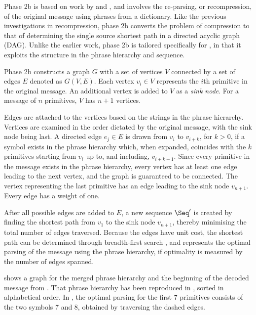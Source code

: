 Phase 2b is based on work by \citet{kr89:cj}
and \citet{klein97:cj}, and involves the re-parsing, or 
recompression, of the original
message using phrases from a dictionary.  Like the previous
investigations in recompression, phase 2b converts the 
problem of compression to that of determining the single
source shortest path in a directed acyclic graph (DAG).  Unlike
the earlier work, phase 2b is tailored specifically for \repair,
in that it exploits the structure in the 
phrase hierarchy and sequence.

Phase 2b constructs a graph $G$
with a set of vertices $V$ connected by a set of edges $E$  
denoted as $G (V,E)$.  Each vertex $v_i \in V$ represents the
$i$th primitive in the original message.  An additional vertex is 
added to $V$ as a {\emph {sink node}}.  For a 
message of $n$ primitives, $V$ has $n + 1$ vertices.

Edges are attached to the vertices based on the strings in
the phrase hierarchy.  
Vertices are examined in the order dictated by the original
message, with the sink node being last.
A directed edge $e_j \in E$ is drawn from $v_i$ to $v_{i + k}$, 
for $k > 0$, if a symbol exists in the phrase hierarchy which,
when expanded, coincides with the $k$ primitives starting from
$v_i$ up to, and including, $v_{i + k - 1}$.
Since every primitive in the
message exists in the phrase hierarchy, every vertex has at 
least one edge leading to the next vertex, and the graph is 
guaranteed to be connected.  The vertex representing the 
last primitive has an edge leading to the sink node $v_{n + 1}$.
Every edge has a weight of one.

After all possible edges are added to $E$, a new sequence
$\Seq'$ is created by finding the shortest path
from $v_1$ to the sink node $v_{n + 1}$, thereby minimising the total number
of edges traversed.  Because the edges have unit cost, 
the shortest path can be determined 
through breadth-first search 
\citep{clrs01:book}, and represents the optimal parsing 
of the message using the phrase hierarchy, if optimality is measured
by the number of edges spanned.

 shows a graph for
the merged phrase hierarchy and the beginning of the decoded
message from .  That phrase hierarchy has
been reproduced in , sorted 
in alphabetical
order.  In , the optimal 
parsing for the first 7 primitives consists of the two 
symbols 7 and 8, obtained by traversing the dashed edges.  

